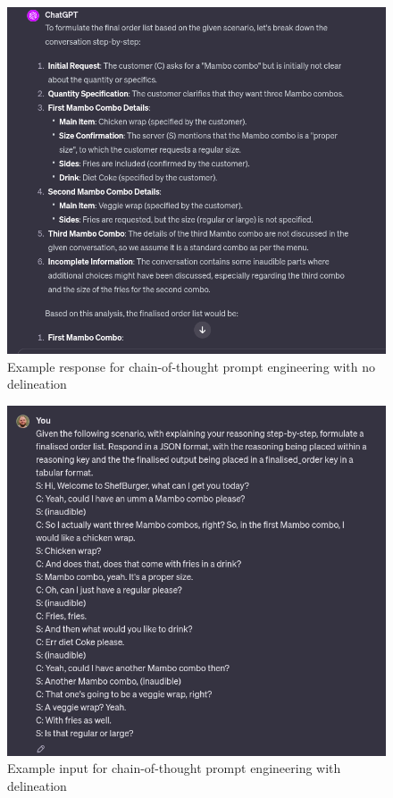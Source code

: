 \begin{figure}
    \centering
    \includegraphics[width=1\linewidth]{sections//images/cot_no_delineation_response.png}
    \caption{Example response for chain-of-thought prompt engineering with no delineation}
    \label{fig:c-o-t-response}
\end{figure}

\begin{figure}
    \centering
    \includegraphics[width=1\linewidth]{sections//images/cot_with_delineation.png}
    \caption{Example input for chain-of-thought prompt engineering with delineation}
    \label{fig:c-o-t-delin}
\end{figure}

